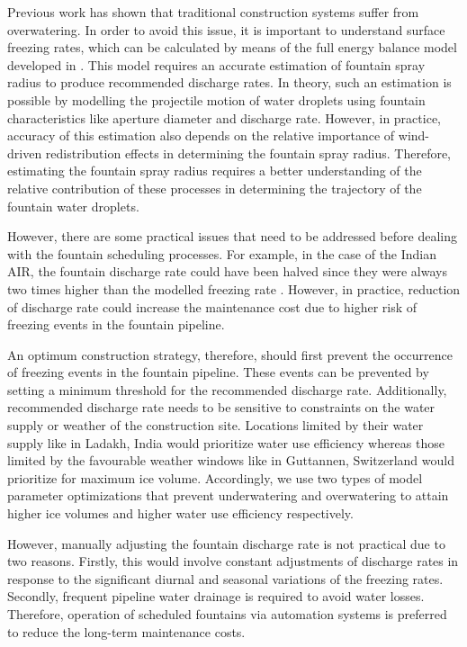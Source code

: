 \documentclass[tc, manuscript]{copernicus}
\begin{document}
Previous work \citep{balasubramanianInfluenceMeteorologicalConditions2022} has shown that traditional
construction systems suffer from overwatering. In order to avoid this issue, it is important to understand
surface freezing rates, which can be calculated by means of the full energy balance model developed in
\cite{balasubramanianInfluenceMeteorologicalConditions2022}. This model requires an accurate estimation of
fountain spray radius to produce recommended discharge rates. In theory, such an estimation is possible by
modelling the projectile motion of water droplets using fountain characteristics like aperture diameter and
discharge rate. However, in practice, accuracy of this estimation also depends on the relative importance of
wind-driven redistribution effects in determining the fountain spray radius. Therefore, estimating the fountain
spray radius requires a better understanding of the relative contribution of these processes in determining the
trajectory of the fountain water droplets.

However, there are some practical issues that need to be addressed before dealing with the fountain scheduling
processes. For example, in the case of the Indian AIR, the fountain discharge rate could have been halved since
they were always two times higher than the modelled freezing rate
\citep{balasubramanianInfluenceMeteorologicalConditions2022}. However, in practice, reduction of discharge rate
could increase the maintenance cost due to higher risk of freezing events in the fountain pipeline.

An optimum construction strategy, therefore, should first prevent the occurrence of freezing events in the
fountain pipeline. These events can be prevented by setting a minimum threshold for the recommended discharge
rate. Additionally, recommended discharge rate needs to be sensitive to constraints on the water supply or
weather of the construction site. Locations limited by their water supply like in Ladakh, India would prioritize
water use efficiency whereas those limited by the favourable weather windows like in Guttannen, Switzerland
would prioritize for maximum ice volume. Accordingly, we use two types of model parameter optimizations that
prevent underwatering and overwatering to attain higher ice volumes and higher water use efficiency
respectively.


However, manually adjusting the fountain discharge rate is not practical due to two reasons. Firstly, this would
involve constant adjustments of discharge rates in response to the significant diurnal and seasonal variations
of the freezing rates. Secondly, frequent pipeline water drainage is required to avoid water losses. Therefore,
operation of scheduled fountains via automation systems is preferred to reduce the long-term maintenance costs.
\end{document}
